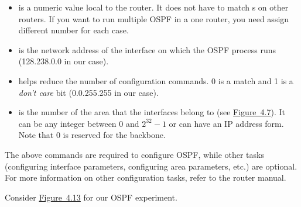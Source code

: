 \documentclass{../UTNetLab}
\begin{document}
\begin{itemize}
    \item {} is a numeric value local to the router.
          It does not have to match s on other routers.
          If you want to run multiple OSPF in a one router, you need assign different number for each case.

    \item {} is the network address of the interface on which the OSPF process runs (128.238.0.0 in our case).

    \item {} helps reduce the number of configuration commands.
          0 is a match and 1 is a \textit{don’t care} bit (0.0.255.255 in our case).

    \item {} is the number of the area that the interfaces belong to (see \hyperref[fig:4.7]{Figure~4.7}).
          It can be any integer between 0 and $2^{32} - 1$ or can have an IP address form.
          Note that 0 is reserved for the backbone.
\end{itemize}

The above commands are required to configure OSPF, while other tasks (configuring interface parameters, configuring area parameters, etc.) are optional.
For more information on other configuration tasks, refer to the router manual.

Consider \hyperref[fig:4.13]{Figure~4.13} for our OSPF experiment.
\end{document}

